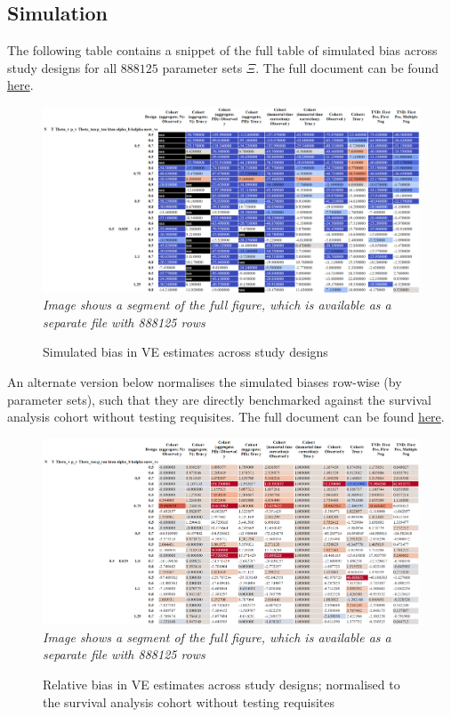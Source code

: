 \documentclass[12pt]{article}
\begin{document}
\subsection{Simulation}
The following table contains a snippet of the full table of simulated bias across study designs for all $888125$ parameter sets $\Xi$. The full document can be found \href{https://www.dropbox.com/sh/7sxgwfymrbkexb9/AADc4E3wb-FEsMr7SMIRqH4Ba?dl=0}{here}.
\begin{figure}[H]
	\centering
	\caption{Simulated bias in VE estimates across study designs}
	\includegraphics[scale=0.3]{VEMethod_Sim1b_Parallel_NoCI_Wide_Gradient_SAMPLE} \\ 
	\textit{\small *Image shows a segment of the full figure, which is available as a separate file with 888125 rows}
\end{figure}

An alternate version below normalises the simulated biases row-wise (by parameter sets), such that they are directly benchmarked against the survival analysis cohort without testing requisites. The full document can be found \href{https://www.dropbox.com/sh/7sxgwfymrbkexb9/AADc4E3wb-FEsMr7SMIRqH4Ba?dl=0}{here}.
\begin{figure}[H]
	\centering
	\caption{Relative bias in VE estimates across study designs; normalised to the survival analysis cohort without testing requisites}
	\includegraphics[scale=0.3]{VEMethod_Sim1b_Parallel_NoCI_Wide_Relative_Gradient_SAMPLE} \\ 
	\textit{\small *Image shows a segment of the full figure, which is available as a separate file with 888125 rows}
\end{figure}
\end{document}
